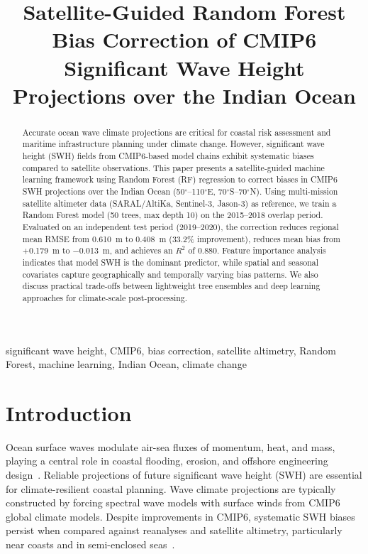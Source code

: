 \documentclass[conference]{IEEEtran}
\begin{document}
\title{Satellite-Guided Random Forest Bias Correction of CMIP6 Significant Wave Height Projections over the Indian Ocean}

\author{
}

\maketitle

\begin{abstract}
Accurate ocean wave climate projections are critical for coastal risk assessment and maritime infrastructure planning under climate change. However, significant wave height (SWH) fields from CMIP6-based model chains exhibit systematic biases compared to satellite observations. This paper presents a satellite-guided machine learning framework using Random Forest (RF) regression to correct biases in CMIP6 SWH projections over the Indian Ocean (50$^{\circ}$--110$^{\circ}$E, 70$^{\circ}$S--70$^{\circ}$N). Using multi-mission satellite altimeter data (SARAL/AltiKa, Sentinel-3, Jason-3) as reference, we train a Random Forest model (50 trees, max depth 10) on the 2015--2018 overlap period. Evaluated on an independent test period (2019--2020), the correction reduces regional mean RMSE from 0.610~m to 0.408~m (33.2\% improvement), reduces mean bias from +0.179~m to $-$0.013~m, and achieves an $R^2$ of 0.880. Feature importance analysis indicates that model SWH is the dominant predictor, while spatial and seasonal covariates capture geographically and temporally varying bias patterns. We also discuss practical trade-offs between lightweight tree ensembles and deep learning approaches for climate-scale post-processing.
\end{abstract}

\begin{IEEEkeywords}
significant wave height, CMIP6, bias correction, satellite altimetry, Random Forest, machine learning, Indian Ocean, climate change
\end{IEEEkeywords}

\section{Introduction}

Ocean surface waves modulate air-sea fluxes of momentum, heat, and mass, playing a central role in coastal flooding, erosion, and offshore engineering design~\cite{lemos2020}. Reliable projections of future significant wave height (SWH) are essential for climate-resilient coastal planning. Wave climate projections are typically constructed by forcing spectral wave models with surface winds from CMIP6 global climate models. Despite improvements in CMIP6, systematic SWH biases persist when compared against reanalyses and satellite altimetry, particularly near coasts and in semi-enclosed seas~\cite{campos2018}.
\end{document}

